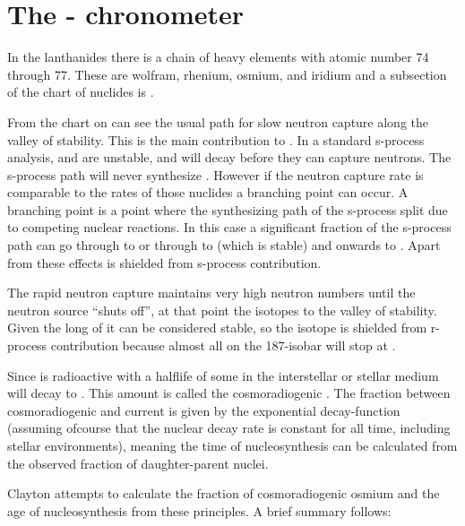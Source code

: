 \section{The - chronometer}

In the lanthanides there is a chain of heavy elements with atomic number 74 through 77.
These are wolfram, rhenium, osmium, and iridium and a subsection of the chart of nuclides is .


From the chart on can see the usual path for slow neutron capture along the valley of stability.
This is the main contribution to . In a standard s-process analysis,  and  are unstable, and will decay before they can capture neutrons. The s-process path will never synthesize . However if the neutron capture rate is comparable to the \betadecay rates of those nuclides a branching point can occur. A branching point is a point where the synthesizing path of the s-process split due to competing nuclear reactions. In this case a significant fraction of the s-process path can go through  to  or through  to  (which is stable) and onwards to . Apart from these effects  is shielded from s-process contribution.

The rapid neutron capture maintains very high neutron numbers until the neutron source ``shuts off'', at that point the isotopes \betadecay to the valley of stability. Given the long \halflife of  it can be considered stable, so the  isotope is shielded from r-process contribution because almost all \betadecay on the 187-isobar will stop at .

Since  is radioactive with a halflife of  some  in the interstellar or stellar medium will decay to . This amount is called the cosmoradiogenic . The fraction between cosmoradiogenic  and current  is given by the exponential decay-function (assuming ofcourse that the nuclear decay rate is constant for all time, including stellar environments), meaning the time of nucleosynthesis can be calculated from the observed fraction of daughter-parent nuclei.

Clayton attempts to calculate the fraction of cosmoradiogenic osmium and the age of nucleosynthesis from these principles.
A brief summary follows:

